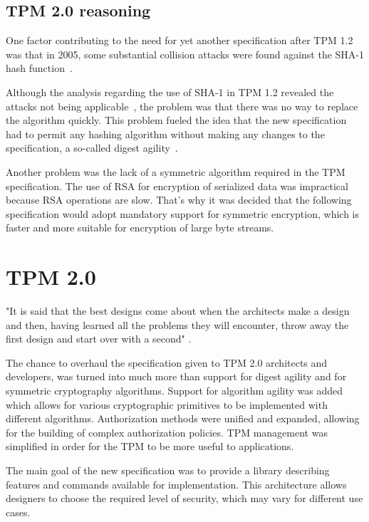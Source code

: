 
\subsection{TPM 2.0 reasoning}
One factor contributing to the need for yet another specification after TPM 1.2 was that in 2005, some substantial collision attacks were found against the SHA-1 hash function~\cite{wang2005findingShaBroken}. 

Although the analysis regarding the use of SHA-1 in TPM 1.2 revealed the attacks not being applicable~\cite{tcg_tpm1.2_sha-1_uses}, the problem was that there was no way to replace the algorithm quickly. This problem fueled the idea that the new specification had to permit any hashing algorithm without making any changes to the specification, a so-called digest agility~\cite[p.~4]{arthur2015practical}. 

Another problem was the lack of a symmetric algorithm required in the TPM specification. The use of RSA for encryption of serialized data was impractical because RSA operations are slow. That's why it was decided that the following specification would adopt mandatory support for symmetric encryption, which is faster and more suitable for encryption of large byte streams. 


\section{TPM 2.0}\label{sec:tpm2}
"It is said that the best designs come about when the architects make a design and
then, having learned all the problems they will encounter, throw away the first design and
start over with a second" \cite[p.~4]{arthur2015practical}.

The chance to overhaul the specification given to TPM 2.0 architects and developers, was turned into much more than support for digest agility and for symmetric cryptography algorithms. Support for algorithm agility was added which allows for various cryptographic primitives to be implemented with different algorithms. Authorization methods were unified and expanded, allowing for the building of complex authorization policies. TPM management was simplified in order for the TPM to be more useful to applications.

The main goal of the new specification was to provide a library describing features and commands available for implementation. This architecture allows designers to choose the required level of security, which may vary for different use cases. 

